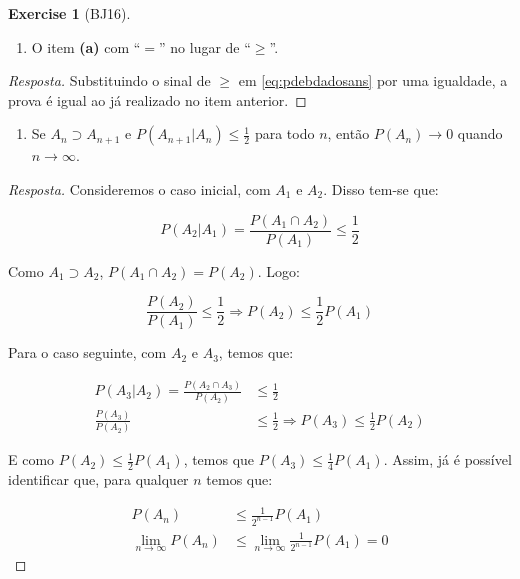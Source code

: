 \documentclass[
]{article}
\providecommand{\tightlist}{%
  \setlength{\itemsep}{0pt}\setlength{\parskip}{0pt}}
\theoremstyle{definition}
\theoremstyle{definition}
\theoremstyle{definition}
\newtheorem{exercise}{Exercise}[section]
\theoremstyle{definition}
\theoremstyle{remark}
\begin{document}
\begin{exercise}[BJ16]
\begin{enumerate}
\def\labelenumi{\alph{enumi})}
\setcounter{enumi}{1}
\tightlist
\item
  O item \textbf{(a)} com ``\(=\)'' no lugar de ``\(\ge\)''.
\end{enumerate}

\begin{proof}[Resposta]
Substituindo o sinal de \(\ge\) em \eqref{eq:pdebdadosans} por uma igualdade, a prova é igual ao já realizado no item anterior.
\end{proof}

\begin{enumerate}
\def\labelenumi{\alph{enumi})}
\setcounter{enumi}{2}
\tightlist
\item
  Se \(A_{n} \supset A_{n+1}\) e \(P(A_{n+1}|A_{n}) \le \frac{1}{2}\) para todo \(n\), então \(P(A_{n}) \to 0\) quando \(n \to \infty\).
\end{enumerate}

\begin{proof}[Resposta]
Consideremos o caso inicial, com \(A_{1}\) e \(A_{2}\). Disso tem-se que:

\begin{equation*}
P(A_{2}|A_{1}) = \frac{P(A_{1} \cap A_{2})}{P(A_{1})} \le \frac{1}{2}
\end{equation*}

Como \(A_{1} \supset A_{2}\), \(P(A_{1} \cap A_{2}) = P(A_{2})\). Logo:

\begin{equation*}
\frac{P(A_{2})}{P(A_{1})} \le \frac{1}{2} \Rightarrow P(A_{2}) \le \frac{1}{2}P(A_{1})
\end{equation*}

Para o caso seguinte, com \(A_{2}\) e \(A_{3}\), temos que:

\begin{align*}
P(A_{3}|A_{2}) = \frac{P(A_{2} \cap A_{3})}{P(A_{2})} &\le \frac{1}{2} \\
\frac{P(A_{3})}{P(A_{2})} &\le \frac{1}{2} \Rightarrow P(A_{3}) \le \frac{1}{2}P(A_{2})
\end{align*}

E como \(P(A_{2}) \le \frac{1}{2}P(A_{1})\), temos que \(P(A_{3}) \le \frac{1}{4}P(A_{1})\). Assim, já é possível identificar que, para qualquer \(n\) temos que:

\begin{align*}
P(A_{n}) &\le \frac{1}{2^{n-1}}P(A_{1}) \\
\lim_{n \to \infty}P(A_{n}) &\le \lim_{n \to \infty}\frac{1}{2^{n-1}}P(A_{1}) = 0
\end{align*}


\end{proof}
\end{exercise}
\end{document}

